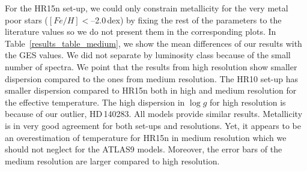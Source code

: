 \documentclass[fleqn,usenatbib]{mnras}
\begin{document}
For the HR15n set-up, we could only constrain metallicity for the very metal poor stars ($[Fe/H]<$--2.0\,dex) by fixing the rest of the parameters to the literature values so we do not 
present them in the corresponding plots. In Table~\ref{results_table_medium}, we show the mean differences of our results with the GES values. We did not separate by luminosity class because 
of the small number of spectra. We point that the results from high resolution show smaller dispersion compared to the ones from medium resolution. 
The HR10 set-up has smaller dispersion compared to HR15n both in high and medium resolution for the effective temperature. The high dispersion in $\log g$ for high resolution is because of 
our outlier, HD\,140283. All models provide similar results. Metallicity is in very good agreement for both set-ups and resolutions. Yet, it appears to be an overestimation of temperature 
for HR15n in medium resolution which we should not neglect for the ATLAS9 models. Moreover, the error bars of the medium resolution are larger compared to high resolution.
\end{document}
